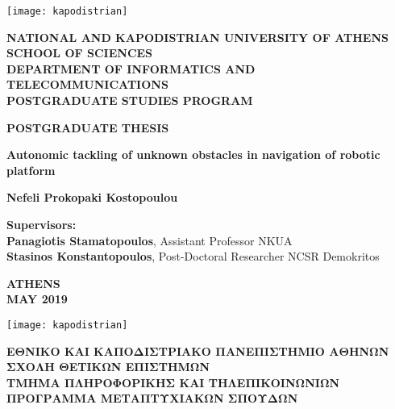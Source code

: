 \begin{titlepage}
	\begin{center}
		\texttt{[image: kapodistrian]}

		\large
		\textbf{NATIONAL AND KAPODISTRIAN UNIVERSITY OF ATHENS}\\
		\vspace{0.2cm}
		\normalsize
		\textbf{SCHOOL OF SCIENCES}\\
		\vspace{0.2cm}
		\textbf{DEPARTMENT OF INFORMATICS AND TELECOMMUNICATIONS}\\
		\vspace{0.2cm}
		\textbf{POSTGRADUATE STUDIES PROGRAM}
		
		\vspace{1.5cm}
		\textbf{POSTGRADUATE THESIS}
		
		\vspace{1.5cm}
		\Large
		\textbf{Autonomic tackling of unknown obstacles in navigation of robotic platform}
		
		\vspace{1.5cm}
		\normalsize
		\textbf{Nefeli Prokopaki Kostopoulou}
		
		\vspace{1.5cm}
		\textbf{Supervisors:}\\
		\textbf{Panagiotis Stamatopoulos}, Assistant Professor NKUA\\
		\textbf{Stasinos Konstantopoulos}, Post-Doctoral Researcher NCSR Demokritos
		
		\vfill
		
		\vspace{0.8cm}
		\textbf{ATHENS}\\
		\textbf{MAY 2019}
		\thispagestyle{empty}
		\newpage
		
		
		\texttt{[image: kapodistrian]}
		
		\large
		\textbf{ΕΘΝΙΚΟ ΚΑΙ ΚΑΠΟΔΙΣΤΡΙΑΚΟ ΠΑΝΕΠΙΣΤΗΜΙΟ ΑΘΗΝΩΝ}\\
		\vspace{0.2cm}
		\normalsize
		\textbf{ΣΧΟΛΗ ΘΕΤΙΚΩΝ ΕΠΙΣΤΗΜΩΝ}\\
		\vspace{0.2cm}
		\textbf{ΤΜΗΜΑ ΠΛΗΡΟΦΟΡΙΚΗΣ ΚΑΙ ΤΗΛΕΠΙΚΟΙΝΩΝΙΩΝ}\\
		\vspace{0.2cm}
		\textbf{ΠΡΟΓΡΑΜΜΑ ΜΕΤΑΠΤΥΧΙΑΚΩΝ ΣΠΟΥΔΩΝ}
		

\end{center}
\end{titlepage}
